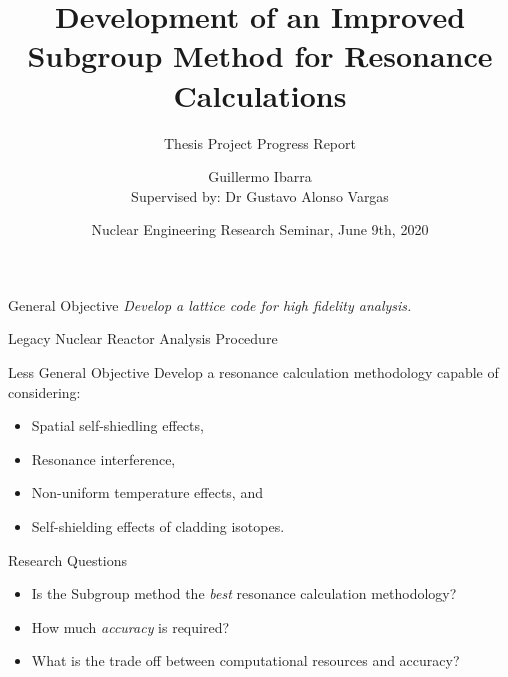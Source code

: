 \documentclass[sans,mathserif,aspectratio=169, 10pt]{beamer}
\title{Development of an Improved Subgroup Method for Resonance Calculations}
\subtitle{Thesis Project Progress Report}
\author[Guillermo Ibarra]{Guillermo Ibarra\\{\small Supervised by: Dr Gustavo Alonso Vargas}}
\date{Nuclear Engineering Research Seminar, June 9th, 2020}
\begin{document}
\begin{frame}
\titlepage
\end{frame}

\begin{frame}{General Objective}
\centering
\LARGE
\emph{\color{steel!115}Develop a lattice code for high fidelity analysis.}
\end{frame}

\begin{frame}{Legacy Nuclear Reactor Analysis Procedure}
\begin{center}
\end{center}
\end{frame}

\begin{frame}{Less General Objective}
Develop a resonance calculation methodology capable of considering:
\begin{itemize}[<+->]
\item Spatial self-shiedling effects,
\item Resonance interference,
\item Non-uniform temperature effects, and
\item Self-shielding effects of cladding isotopes. 
\end{itemize}
\end{frame}

\begin{frame}{Research Questions}
\begin{itemize}[<+->]
\item Is the Subgroup method the \emph{best} resonance calculation methodology?
\item How much \emph{accuracy} is required? 
\item What is the trade off between computational resources and accuracy?
\end{itemize}
\end{frame}
\end{document}
